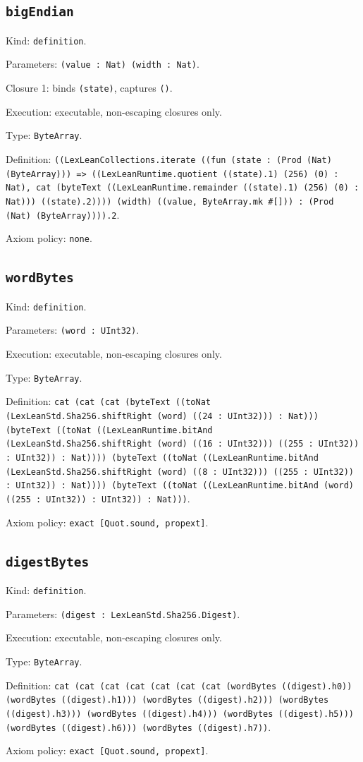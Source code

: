 \documentclass[11pt]{article}
\begin{document}
\subsection*{\texttt{bigEndian}}
\noindent Kind: \texttt{definition}.\par
\noindent Parameters: \texttt{(value : Nat) (width : Nat)}.\par
\noindent Closure 1: binds \texttt{(state)}, captures \texttt{()}.\par
\noindent Execution: executable, non-escaping closures only.\par
\noindent Type: \texttt{ByteArray}.\par
\noindent Definition: \texttt{((LexLeanCollections.iterate ((fun (state : (Prod (Nat) (ByteArray))) => ((LexLeanRuntime.quotient ((state).1) (256) (0) : Nat), cat (byteText ((LexLeanRuntime.remainder ((state).1) (256) (0) : Nat))) ((state).2)))) (width) ((value, ByteArray.mk \#[])) : (Prod (Nat) (ByteArray)))).2}.\par
\noindent Axiom policy: \texttt{none}.\par
\subsection*{\texttt{wordBytes}}
\noindent Kind: \texttt{definition}.\par
\noindent Parameters: \texttt{(word : UInt32)}.\par
\noindent Execution: executable, non-escaping closures only.\par
\noindent Type: \texttt{ByteArray}.\par
\noindent Definition: \texttt{cat (cat (cat (byteText ((toNat (LexLeanStd.Sha256.shiftRight (word) ((24 : UInt32))) : Nat))) (byteText ((toNat ((LexLeanRuntime.bitAnd (LexLeanStd.Sha256.shiftRight (word) ((16 : UInt32))) ((255 : UInt32)) : UInt32)) : Nat)))) (byteText ((toNat ((LexLeanRuntime.bitAnd (LexLeanStd.Sha256.shiftRight (word) ((8 : UInt32))) ((255 : UInt32)) : UInt32)) : Nat)))) (byteText ((toNat ((LexLeanRuntime.bitAnd (word) ((255 : UInt32)) : UInt32)) : Nat)))}.\par
\noindent Axiom policy: \texttt{exact [Quot.sound, propext]}.\par
\subsection*{\texttt{digestBytes}}
\noindent Kind: \texttt{definition}.\par
\noindent Parameters: \texttt{(digest : LexLeanStd.Sha256.Digest)}.\par
\noindent Execution: executable, non-escaping closures only.\par
\noindent Type: \texttt{ByteArray}.\par
\noindent Definition: \texttt{cat (cat (cat (cat (cat (cat (cat (wordBytes ((digest).h0)) (wordBytes ((digest).h1))) (wordBytes ((digest).h2))) (wordBytes ((digest).h3))) (wordBytes ((digest).h4))) (wordBytes ((digest).h5))) (wordBytes ((digest).h6))) (wordBytes ((digest).h7))}.\par
\noindent Axiom policy: \texttt{exact [Quot.sound, propext]}.\par
\end{document}
